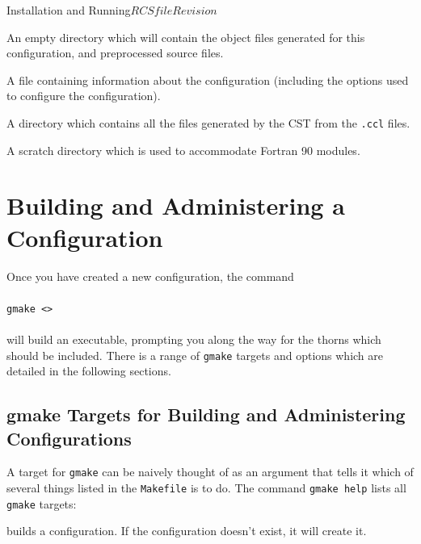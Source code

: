 \begin{cactuspart}{Installation and Running}{$RCSfile$}{$Revision$}
\begin{Lentry}
\item [\texttt{build}]
An empty directory which will contain the object files generated for this
configuration, and preprocessed source files.

\item [\texttt{config-info}]
A file containing information about the configuration (including the options used to configure the configuration).

\item [\texttt{bindings}] A directory which contains all the files
generated by the CST from the \texttt{.ccl} files.

\item [\texttt{scratch}]
A scratch directory which is used to accommodate Fortran 90 modules.

\end{Lentry}


\section{Building and Administering a Configuration}
\label{sec:buanadaco}

Once you have created a new configuration, the command
\\ \\
\texttt{gmake <>}
\\ \\
will build an executable, prompting you along the way for the
thorns which should be included. There is a range of \texttt{gmake}
targets and options which are detailed in the following sections.

\subsection{gmake Targets for Building and Administering Configurations}
\label{sec:gmtafobuanadco}

A target for \texttt{gmake} can be naively thought of as an argument
that tells it which of several things listed in the \texttt{Makefile} is to do. The command \texttt{gmake help} lists all \texttt{gmake} targets:

\begin{Lentry}

\item [\texttt{gmake <\var{config}>}]
        builds a configuration. If the configuration doesn't exist,
        it will create it.


\end{Lentry}
\end{cactuspart}
